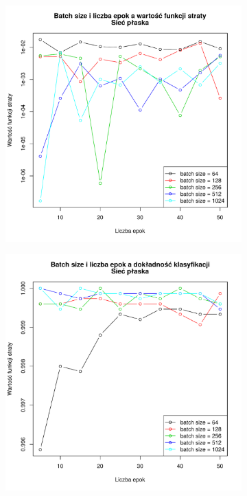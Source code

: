 \documentclass[11pt,a4paper]{article}
\begin{document}
\begin{figure}
\begin{subfigure}{0.45\textwidth}
    \end{subfigure}
    \\
    \begin{subfigure}{0.45\textwidth}
        \includegraphics[width=\textwidth]{res/img/loss_vec.pdf}
    \end{subfigure}
    \qquad
    \begin{subfigure}{0.45\textwidth}
        \includegraphics[width=\textwidth]{res/img/acc_vec.pdf}

\end{subfigure}
\end{figure}
\end{document}
